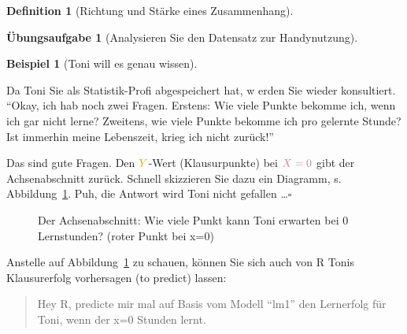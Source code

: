 \documentclass[
  a4paper,
  DIV=11]{scrreprt}
\theoremstyle{definition}
\newtheorem{exercise}{Übungsaufgabe}[chapter]
\theoremstyle{definition}
\newtheorem{example}{Beispiel}[chapter]
\theoremstyle{definition}
\newtheorem{definition}{Definition}[chapter]
\theoremstyle{remark}
\begin{document}
\begin{definition}[Richtung und Stärke eines
Zusammenhang]
\begin{exercise}[Analysieren Sie den Datensatz zur
Handynutzung]
\begin{example}[Toni will es genau
wissen]\protect\hypertarget{exm-noten5}{}\label{exm-noten5}

Da Toni Sie als Statistik-Profi abgespeichert hat, w erden Sie wieder
konsultiert. ``Okay, ich hab noch zwei Fragen. Erstens: Wie viele Punkte
bekomme ich, wenn ich gar nicht lerne? Zweitens, wie viele Punkte
bekomme ich pro gelernte Stunde? Ist immerhin meine Lebenszeit, krieg
ich nicht zurück!''

Das sind gute Fragen. Den \(\color{ycol}{Y}\)-Wert (Klausurpunkte) bei
\(\color{xcol}{X}=0\) gibt der Achsenabschnitt zurück. Schnell
skizzieren Sie dazu ein Diagramm, s. Abbildung~\ref{fig-beta0}. Puh, die
Antwort wird Toni nicht gefallen \ldots{}\(\square\)

\end{example}

\begin{figure}


\caption{\label{fig-beta0}Der Achsenabschnitt: Wie viele Punkt kann Toni
erwarten bei 0 Lernstunden? (roter Punkt bei x=0)}

\end{figure}%

Anstelle auf Abbildung~\ref{fig-beta0} zu schauen, können Sie sich auch
von R Tonis Klausurerfolg vorhersagen (to predict) lassen:

\begin{quote}
{} Hey R, predicte mir mal auf Basis vom Modell ``lm1''
den Lernerfolg für Toni, wenn der x=0 Stunden lernt.
\end{quote}


\end{exercise}
\end{definition}
\end{document}
